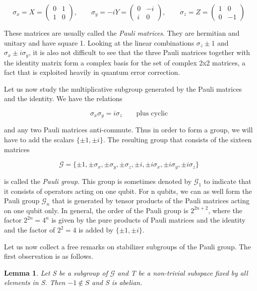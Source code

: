 \documentclass[a4paper, draft]{article}
\theoremstyle{own}
\newtheorem{lem}[thm]{Lemma}
\theoremstyle{remark}
\begin{document}
$$
\sigma_x = X = \begin{pmatrix} 0 & 1 \\ 1 & 0 \end{pmatrix}, \qquad
\sigma_y = -iY = \begin{pmatrix} 0 & -i \\ i & 0 \end{pmatrix}, \qquad
\sigma_z = Z = \begin{pmatrix} 1 & 0 \\ 0 & -1 \end{pmatrix}
$$

These matrices are usually called the \emph{Pauli matrices}. They are hermitian and unitary and have square 1. Looking at the linear combinations $\sigma_z \pm 1$ and $\sigma_x \pm i \sigma_y$, it is also not difficult to see that the three Pauli matrices together with the identity matrix form a complex basis for the set of complex 2x2 matrices, a fact that is exploited heavily in quantum error correction. 

Let us now study the multiplicative subgroup generated by the Pauli matrices and the identity. We have the relations 

$$
\sigma_x \sigma_y = i \sigma_z \qquad \text{plus cyclic}
$$

and any two Pauli matrices anti-commute. Thus in order to form a group, we will have to add the scalars $\{\pm 1, \pm i\}$. The resulting group that consists of the sixteen matrices

$$
\mathcal{G} = \{
\pm 1, \pm \sigma_x, \pm \sigma_y, \pm \sigma_z, 
\pm i, \pm i \sigma_x, \pm i \sigma_y, \pm i \sigma_z 
\}          
$$

is called the \emph{Pauli group}. This group is sometimes denoted by $\mathcal{G}_1$ to indicate that it consists of operators acting on one qubit. For n qubits, we can as well form the Pauli group $\mathcal{G}_n$ that is generated by tensor products of the Pauli matrices acting on one qubit only. In general, the order of the Pauli group is $2^{2n+2}$, where the factor $2^{2n} = 4^n$ is given by the pure products of Pauli matrices and the identity and the factor of $2^2 =4$ is added by $\{\pm 1, \pm i\}$. 

Let us now collect a free remarks on stabilizer subgroups of the Pauli group. The first observation is as follows.

\begin{lem}
Let S be a subgroup of $\mathcal{G}$ and T be a non-trivial subspace fixed by all elements in S. Then $-1 \notin S$ and S is abelian.
\end{lem}
\end{document}
